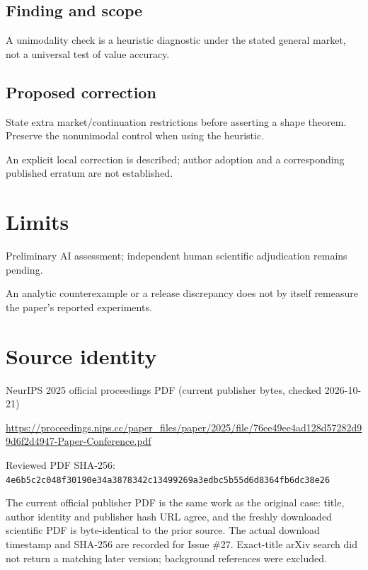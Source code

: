 \documentclass[11pt]{article}
\begin{document}
\subsection*{Finding and scope}

A unimodality check is a heuristic diagnostic under the stated general market, not a universal test of value accuracy.

\subsection*{Proposed correction}

State extra market/continuation restrictions before asserting a shape theorem. Preserve the nonunimodal control when using the heuristic.

An explicit local correction is described; author adoption and a corresponding published erratum are not established.

\section*{Limits}

Preliminary AI assessment; independent human scientific adjudication remains pending.\par

An analytic counterexample or a release discrepancy does not by itself remeasure the paper’s reported experiments.\par

\section*{Source identity}

NeurIPS 2025 official proceedings PDF (current publisher bytes, checked 2026-10-21)

\url{https://proceedings.nips.cc/paper_files/paper/2025/file/76ee49ee4ad128d57282d99d6f2d4947-Paper-Conference.pdf}

Reviewed PDF SHA-256: \nolinkurl{4e6b5c2c048f30190e34a3878342c13499269a3edbc5b55d6d8364fb6dc38e26}

The current official publisher PDF is the same work as the original case: title, author identity and publisher hash URL agree, and the freshly downloaded scientific PDF is byte-identical to the prior source. The actual download timestamp and SHA-256 are recorded for Issue \#27. Exact-title arXiv search did not return a matching later version; background references were excluded.
\end{document}
